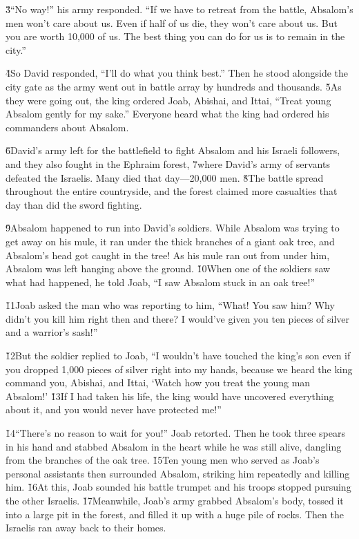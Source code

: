 \v{3}``No way!'' his army responded. ``If we have to retreat from the battle, Absalom's men won't care about us. Even if half of us die, they won't care about us. But you are worth 10,000 of us. The best thing you can do for us is to remain in the city.''

\v{4}So David responded, ``I'll do what you think best.'' Then he stood alongside the city gate as the army went out in battle array by hundreds and thousands. \v{5}As they were going out, the king ordered Joab, Abishai, and Ittai, ``Treat young Absalom gently for my sake.'' Everyone heard what the king had ordered his commanders about Absalom.

\v{6}David's army left for the battlefield to fight Absalom and his Israeli followers, and they also fought in the Ephraim forest, \v{7}where David's army of servants defeated the Israelis. Many died that day---20,000 men. \v{8}The battle spread throughout the entire countryside, and the forest claimed more casualties that day than did the sword fighting.

\v{9}Absalom happened to run into David's soldiers. While Absalom was trying to get away on his mule, it ran under the thick branches of a giant oak tree, and Absalom's head got caught in the tree! As his mule ran out from under him, Absalom was left hanging above the ground. \v{10}When one of the soldiers saw what had happened, he told Joab, ``I saw Absalom stuck in an oak tree!''

\v{11}Joab asked the man who was reporting to him, ``What! You saw him? Why didn't you kill him right then and there? I would've given you ten pieces of silver and a warrior's sash!''

\v{12}But the soldier replied to Joab, ``I wouldn't have touched the king's son even if you dropped 1,000 pieces of silver right into my hands, because we heard the king command you, Abishai, and Ittai, `Watch how you treat the young man Absalom!' \v{13}If I had taken his life, the king would have uncovered everything about it, and you would never have protected me!''

\v{14}``There's no reason to wait for you!'' Joab retorted. Then he took three spears in his hand and stabbed Absalom in the heart while he was still alive, dangling from the branches of the oak tree. \v{15}Ten young men who served as Joab's personal assistants then surrounded Absalom, striking him repeatedly and killing him. \v{16}At this, Joab sounded his battle trumpet and his troops stopped pursuing the other Israelis. \v{17}Meanwhile, Joab's army grabbed Absalom's body, tossed it into a large pit in the forest, and filled it up with a huge pile of rocks. Then the Israelis ran away back to their homes.

